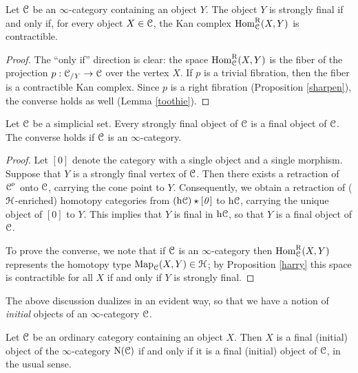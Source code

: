 \begin{1.2.12 Initial and final objects}
\begin{proposition}\label{harry}
Let $\operatorname{\mathcal{C}}$ be an $\infty$-category containing an object $Y$. The object
$Y$ is strongly final if and only if, for every object $X \in \operatorname{\mathcal{C}}$, the Kan
complex $\operatorname{Hom}^{\operatorname{R}}_{\operatorname{\mathcal{C}}}(X,Y)$ is contractible.
\end{proposition}

\begin{proof}
The ``only if'' direction is clear: the space
$\operatorname{Hom}^{\operatorname{R}}_{\operatorname{\mathcal{C}}}(X,Y)$ is the fiber of the projection $p: \operatorname{\mathcal{C}}_{/Y}
\rightarrow \operatorname{\mathcal{C}}$ over the vertex $X$. If $p$ is a trivial
fibration, then the fiber is a contractible Kan complex. Since $p$
is a right fibration (Proposition \ref{sharpen}), the converse holds as well (Lemma \ref{toothie}).
\end{proof}

\begin{corollary}
Let $\operatorname{\mathcal{C}}$ be a simplicial set. Every strongly final object of $\operatorname{\mathcal{C}}$ is a final object of $\operatorname{\mathcal{C}}$. The converse holds if $\operatorname{\mathcal{C}}$ is an $\infty$-category.
\end{corollary}

\begin{proof}
Let $[0]$ denote the category with a single object and a single morphism.
Suppose that $Y$ is a strongly final vertex of $\operatorname{\mathcal{C}}$. Then there exists a retraction of
$\operatorname{\mathcal{C}}^{\triangleright}$ onto $\operatorname{\mathcal{C}}$, carrying the cone point to $Y$. Consequently, we obtain a retraction of ($\operatorname{\mathcal{H}}$-enriched) homotopy categories from $(\rm{h} \it{\operatorname{\mathcal{C}}}) \star [0]$ to $\rm{h} \it{\operatorname{\mathcal{C}}}$, carrying the unique object of $[0]$ to $Y$. This implies that $Y$ is final in $\rm{h} \it{\operatorname{\mathcal{C}}}$, so that $Y$ is a final object of $\operatorname{\mathcal{C}}$.

To prove the converse, we note that if $\operatorname{\mathcal{C}}$ is an $\infty$-category then $\operatorname{Hom}_{\operatorname{\mathcal{C}}}^{\operatorname{R}}(X,Y)$ represents the homotopy type $\operatorname{{Map}}_{\operatorname{\mathcal{C}}}(X,Y) \in \operatorname{\mathcal{H}}$; by Proposition \ref{harry} this space is contractible for all $X$ if and only if $Y$ is strongly final.
\end{proof}

\begin{remark}
The above discussion dualizes in an evident way, so that we have a notion of {\em initial} objects of an $\infty$-category $\operatorname{\mathcal{C}}$.
\end{remark}

\begin{example}
Let $\operatorname{\mathcal{C}}$ be an ordinary category containing an object $X$. Then $X$ is a final (initial)
object of the $\infty$-category $\operatorname{N}(\operatorname{\mathcal{C}})$ if and only if it is a final (initial) object of $\operatorname{\mathcal{C}}$, in the usual sense.
\end{example}


\end{1.2.12 Initial and final objects}
